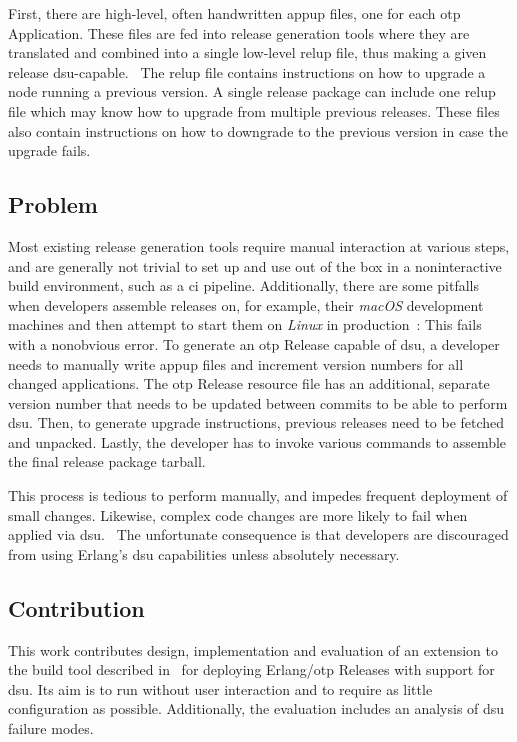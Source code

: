 First, there are high-level, often handwritten \acrfull{appup} files, one for each \acrshort{otp} Application. These files are fed into release generation tools where they are translated and combined into a single low-level \acrshort{relup} file, thus making a given release \acrshort{dsu}-capable.~\cite{doc:otp} The \acrshort{relup} file contains instructions on how to upgrade a node running a previous version. A single release package can include one \acrshort{relup} file which may know how to upgrade from multiple previous releases. These files also contain instructions on how to downgrade to the previous version in case the upgrade fails.~\cite{doc:otp}

\subsection{Problem}\label{sec:problem} Most existing release generation tools require manual interaction at various steps, and are generally not trivial to set up and use out of the box in a noninteractive build environment, such as a \acrfull{ci} pipeline. Additionally, there are some pitfalls when developers assemble releases on, for example, their \emph{macOS} development machines and then attempt to start them on \emph{Linux} in production~\cite{cesarini:otp}: This fails with a nonobvious error. To generate an \acrshort{otp} Release capable of \acrshort{dsu}, a developer needs to manually write \acrshort{appup} files and increment version numbers for all changed applications. The \acrshort{otp} Release resource file has an additional, separate version number that needs to be updated between commits to be able to perform \acrshort{dsu}. Then, to generate upgrade instructions, previous releases need to be fetched and unpacked. Lastly, the developer has to invoke various commands to assemble the final release package tarball.~\cite{ferd}

This process is tedious to perform manually, and impedes frequent deployment of small changes. Likewise, complex code changes are more likely to fail when applied via \acrshort{dsu}.~\cite{hicks} The unfortunate consequence is that developers are discouraged from using Erlang's \acrshort{dsu} capabilities unless absolutely necessary.~\cite{ferd}

\subsection{Contribution}

This work contributes design, implementation and evaluation of an extension to the build tool described in~\cite{zak18} for deploying Erlang/\acrshort{otp} Releases with support for \acrshort{dsu}. Its aim is to run without user interaction and to require as little configuration as possible. Additionally, the evaluation includes an analysis of \acrshort{dsu} failure modes.

